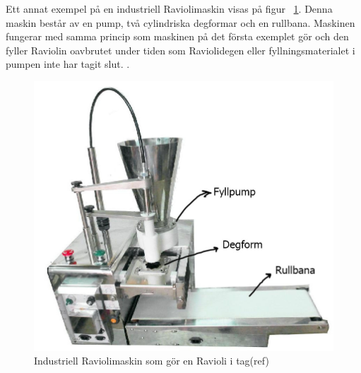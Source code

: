 Ett annat exempel på en industriell Raviolimaskin visas på figur ~\ref{industraviol_2}. Denna maskin består av en pump, två cylindriska degformar och en rullbana. Maskinen fungerar med samma princip som maskinen på det första exemplet gör och den fyller Raviolin oavbrutet under tiden som  Raviolidegen eller fyllningsmaterialet i pumpen inte har tagit slut.   .
 \begin{figure}[ht]
 	\begin{center}
 		\includegraphics[scale=0.4]{images/industriell_machine_comment.jpg}
 		\caption{Industriell Raviolimaskin som gör en Ravioli i tag(ref)}
 		\label{industraviol_2}	
 	\end{center}
 \end{figure}
 
 

 